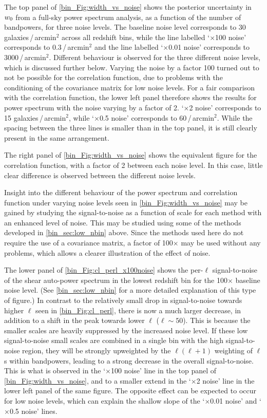 The top panel of \autoref{bin_Fig:width_vs_noise} shows the posterior uncertainty in $w_0$ from a full-sky power spectrum analysis, as a function of the number of bandpowers, for three noise levels. The baseline noise level corresponds to 30 galaxies\,/\,arcmin${}^2$ across all redshift bins, while the line labelled `$\times$100 noise' corresponds to 0.3\,/\,arcmin${}^2$ and the line labelled `$\times$0.01 noise' corresponds to 3000\,/\,arcmin${}^2$. Different behaviour is observed for the three different noise levels, which is discussed further below. Varying the noise by a factor 100 turned out to not be possible for the correlation function, due to problems with the conditioning of the covariance matrix for low noise levels. For a fair comparison with the correlation function, the lower left panel therefore shows the results for power spectrum with the noise varying by a factor of 2. `$\times$2 noise' corresponds to 15 galaxies\,/\,arcmin${}^2$, while `$\times$0.5 noise' corresponds to 60\,/\,arcmin${}^2$. While the spacing between the three lines is smaller than in the top panel, it is still clearly present in the same arrangement.

The right panel of \autoref{bin_Fig:width_vs_noise} shows the equivalent figure for the correlation function, with a factor of 2 between each noise level. In this case, little clear difference is observed between the different noise levels.

Insight into the different behaviour of the power spectrum and correlation function under varying noise levels seen in \autoref{bin_Fig:width_vs_noise} may be gained by studying the signal-to-noise as a function of scale for each method with an enhanced level of noise. This may be studied using some of the methods developed in \autoref{bin_sec:low_nbin} above. Since the methods used here do not require the use of a covariance matrix, a factor of 100$\times$ may be used without any problems, which allows a clearer illustration of the effect of noise.

The lower panel of \autoref{bin_Fig:cl_perl_x100noise} shows the per-$\ell$ signal-to-noise of the shear auto-power spectrum in the lowest redshift bin for the 100$\times$ baseline noise level. (See \autoref{bin_sec:low_nbin} for a more detailed explanation of this type of figure.) In contrast to the relatively small drop in signal-to-noise towards higher $\ell$ seen in \autoref{bin_Fig:cl_perl}, there is now a much larger decrease, in addition to a shift in the peak towards lower $\ell$ ($\ell \sim 50$). This is because the smaller scales are heavily suppressed by the increased noise level. If these low signal-to-noise small scales are combined in a single bin with the high signal-to-noise region, they will be strongly upweighted by the $\ell \left( \ell + 1 \right)$ weighting of $\ell$s within bandpowers, leading to a strong decrease in the overall signal-to-noise. This is what is observed in the `$\times$100 noise' line in the top panel of \autoref{bin_Fig:width_vs_noise}, and to a smaller extend in the `$\times$2 noise' line in the lower left panel of the same figure. The opposite effect can be expected to occur for low noise levels, which can explain the shallow slope of the `$\times$0.01 noise' and `$\times$0.5 noise' lines.

